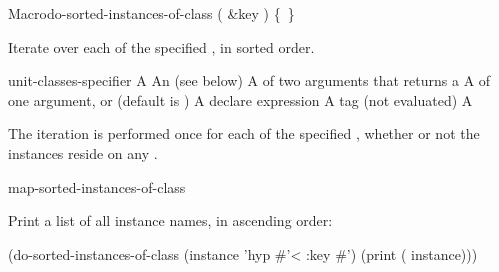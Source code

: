 \documentclass[10pt,twoside,english,pdftex]{article}
\begin{document}
\begin{functiondoc}{Macro}{do-sorted-instances-of-class}%
  {( \&key )
    \mbox{\{ \vbar{} \}\superstar}}
%
%

\fnsyntax

\fnpurpose Iterate over each  of the specified
, in sorted order.

\fnpackage {}

\fnmodule {}

\fnargs
\begin{args}{unit-classes-specifier}
\arg[var] A 
 An 
(see below)
\arg[predicate] A  of two arguments that returns a
\arg[key] A  of one argument, or \nil{} (default is \nil)
\arg[declaration] A declare expression
\arg[tag] A  tag (not evaluated)
\arg[form] A 
\end{args}

\fndsyntax
\unitclassesspec
\subclassingspec

\fndescription The iteration is performed once for each 
of the specified , whether or not the instances reside on
any .

\begin{alsos}{map-sorted-instances-of-class}
\end{alsos}

\fnexample
Print a list of all  instance names, in ascending order:
\begin{example}
  (do-sorted-instances-of-class (instance 'hyp #'< :key #')
     (print ( instance)))
\end{example} 

\end{functiondoc}

\end{document}
